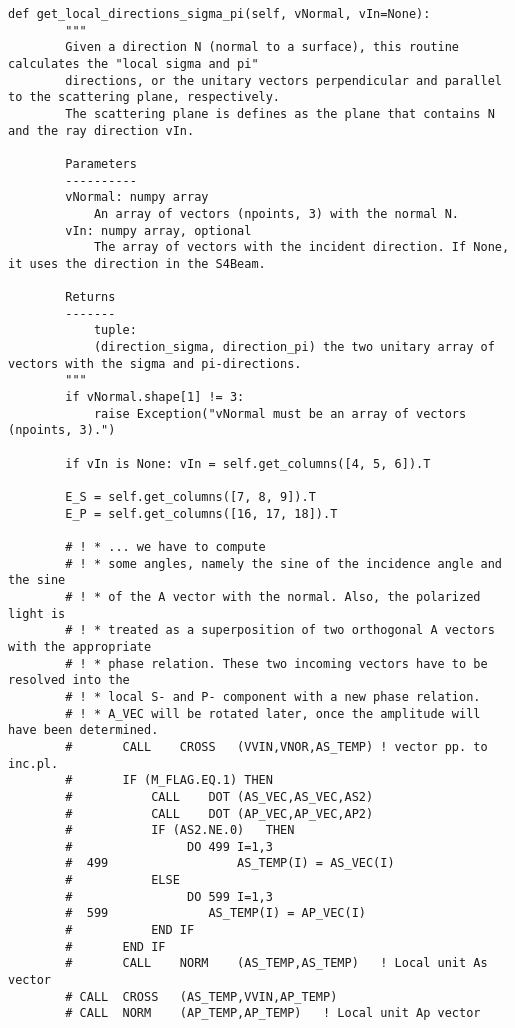 \documentclass{iucr}
\begin{document}
\begin{lstlisting}[caption={Method of {\tt S4Beam} to compute the local directions $\sigma$ and $\pi$ at the beamline element.}, label={lst:localsigmaandpi}, captionpos=b]
    def get_local_directions_sigma_pi(self, vNormal, vIn=None):
        """
        Given a direction N (normal to a surface), this routine calculates the "local sigma and pi"
        directions, or the unitary vectors perpendicular and parallel to the scattering plane, respectively.
        The scattering plane is defines as the plane that contains N and the ray direction vIn.

        Parameters
        ----------
        vNormal: numpy array
            An array of vectors (npoints, 3) with the normal N.
        vIn: numpy array, optional
            The array of vectors with the incident direction. If None, it uses the direction in the S4Beam.

        Returns
        -------
            tuple:
            (direction_sigma, direction_pi) the two unitary array of vectors with the sigma and pi-directions.
        """
        if vNormal.shape[1] != 3:
            raise Exception("vNormal must be an array of vectors (npoints, 3).")

        if vIn is None: vIn = self.get_columns([4, 5, 6]).T

        E_S = self.get_columns([7, 8, 9]).T
        E_P = self.get_columns([16, 17, 18]).T

        # ! * ... we have to compute
        # ! * some angles, namely the sine of the incidence angle and the sine
        # ! * of the A vector with the normal. Also, the polarized light is
        # ! * treated as a superposition of two orthogonal A vectors with the appropriate
        # ! * phase relation. These two incoming vectors have to be resolved into the
        # ! * local S- and P- component with a new phase relation.
        # ! * A_VEC will be rotated later, once the amplitude will have been determined.
        #      	CALL	CROSS 	(VVIN,VNOR,AS_TEMP)	! vector pp. to inc.pl.
        #      	IF (M_FLAG.EQ.1) THEN
        # 	        CALL	DOT	(AS_VEC,AS_VEC,AS2)
        # 	        CALL	DOT	(AP_VEC,AP_VEC,AP2)
        # 	        IF (AS2.NE.0)	THEN
        #              	 DO 499 I=1,3
        #  499   	            AS_TEMP(I) = AS_VEC(I)
        # 	        ELSE
        # 	             DO 599 I=1,3
        #  599	            AS_TEMP(I) = AP_VEC(I)
        # 	        END IF
        #      	END IF
        #      	CALL	NORM  	(AS_TEMP,AS_TEMP)	! Local unit As vector
        # CALL	CROSS	(AS_TEMP,VVIN,AP_TEMP)
        # CALL	NORM	(AP_TEMP,AP_TEMP)	! Local unit Ap vector


\end{lstlisting}
\end{document}
